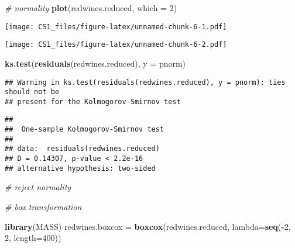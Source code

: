 \documentclass[
]{article}
\newenvironment{Shaded}{\begin{snugshade}}{\end{snugshade}}
\newcommand{\CommentTok}[1]{\textcolor[rgb]{0.56,0.35,0.01}{\textit{#1}}}
\newcommand{\DataTypeTok}[1]{\textcolor[rgb]{0.13,0.29,0.53}{#1}}
\newcommand{\DecValTok}[1]{\textcolor[rgb]{0.00,0.00,0.81}{#1}}
\newcommand{\KeywordTok}[1]{\textcolor[rgb]{0.13,0.29,0.53}{\textbf{#1}}}
\newcommand{\NormalTok}[1]{#1}
\newcommand{\OperatorTok}[1]{\textcolor[rgb]{0.81,0.36,0.00}{\textbf{#1}}}
\newcommand{\StringTok}[1]{\textcolor[rgb]{0.31,0.60,0.02}{#1}}
\begin{document}
\begin{Shaded}
\begin{Highlighting}[]
\CommentTok{# normality}
\KeywordTok{plot}\NormalTok{(redwines.reduced, }\DataTypeTok{which =}  \DecValTok{2}\NormalTok{)}
\end{Highlighting}
\end{Shaded}

\texttt{[image: CS1\_files/figure-latex/unnamed-chunk-6-1.pdf]}

\begin{Shaded}
\end{Shaded}

\texttt{[image: CS1\_files/figure-latex/unnamed-chunk-6-2.pdf]}

\begin{Shaded}
\begin{Highlighting}[]
\KeywordTok{ks.test}\NormalTok{(}\KeywordTok{residuals}\NormalTok{(redwines.reduced), }\DataTypeTok{y =}\NormalTok{ pnorm)}
\end{Highlighting}
\end{Shaded}

\begin{verbatim}
## Warning in ks.test(residuals(redwines.reduced), y = pnorm): ties should not be
## present for the Kolmogorov-Smirnov test
\end{verbatim}

\begin{verbatim}
## 
##  One-sample Kolmogorov-Smirnov test
## 
## data:  residuals(redwines.reduced)
## D = 0.14307, p-value < 2.2e-16
## alternative hypothesis: two-sided
\end{verbatim}

\begin{Shaded}
\begin{Highlighting}[]
\CommentTok{# reject normality}
\end{Highlighting}
\end{Shaded}

\begin{Shaded}
\begin{Highlighting}[]
\CommentTok{# box transformation}

\KeywordTok{library}\NormalTok{(MASS)}
\NormalTok{redwines.boxcox =}\StringTok{ }\KeywordTok{boxcox}\NormalTok{(redwines.reduced, }\DataTypeTok{lambda=}\KeywordTok{seq}\NormalTok{(}\OperatorTok{-}\DecValTok{2}\NormalTok{, }\DecValTok{2}\NormalTok{, }\DataTypeTok{length=}\DecValTok{400}\NormalTok{))}
\end{Highlighting}
\end{Shaded}
\end{document}
